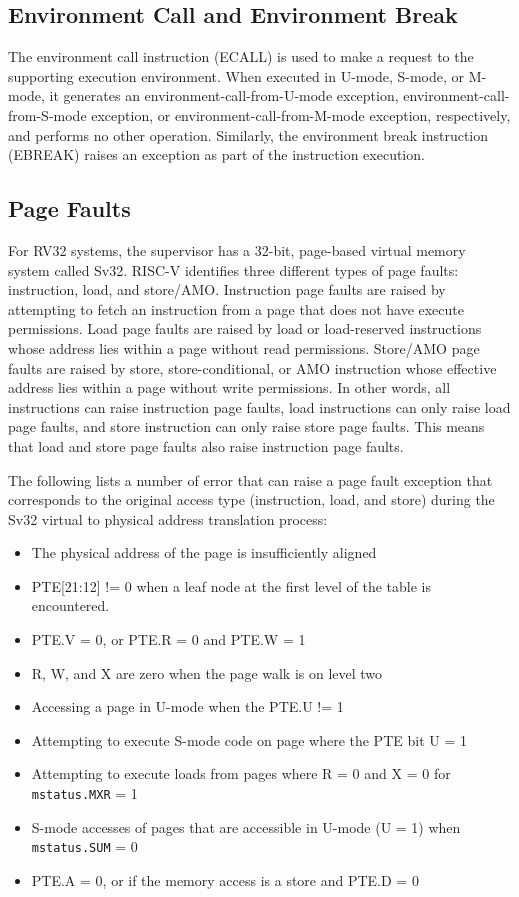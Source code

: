 \documentclass[12pt]{article}
\begin{document}
\subsection{Environment Call and Environment Break}
The environment call instruction (ECALL) is used to make a request to the supporting execution environment. When executed in U-mode, S-mode, or M-mode, it generates an environment-call-from-U-mode exception, environment-call-from-S-mode exception, or environment-call-from-M-mode exception, respectively, and performs no other operation. Similarly, the environment break instruction (EBREAK) raises an exception as part of the instruction execution.

\subsection{Page Faults}
For RV32 systems, the supervisor has a 32-bit, page-based virtual memory system called Sv32. RISC-V identifies three different types of page faults: instruction, load, and store/AMO. Instruction page faults are raised by attempting to fetch an instruction from a page that does not have execute permissions. Load page faults are raised by load or load-reserved instructions whose address lies within a page without read permissions. Store/AMO page faults are raised by store, store-conditional, or AMO instruction whose effective address lies within a page without write permissions. In other words, all instructions can raise instruction page faults, load instructions can only raise load page faults, and store instruction can only raise store page faults. This means that load and store page faults also raise instruction page faults. 

The following lists a number of error that can raise a page fault exception that corresponds to the original access type (instruction, load, and store) during the Sv32 virtual to physical address translation process:
\begin{itemize}
    \item The physical address of the page is insufficiently aligned
    \item PTE[21:12] != 0 when a leaf node at the first level of the table is encountered.
    \item PTE.V = 0, or PTE.R = 0 and PTE.W = 1
    \item R, W, and X are zero when the page walk is on level two
    \item Accessing a page in U-mode when the PTE.U != 1
    \item Attempting to execute S-mode code on page where the PTE bit U = 1
    \item Attempting to execute loads from pages where R = 0 and X = 0 for {\tt{mstatus.MXR}} = 1
    \item S-mode accesses of pages that are accessible in U-mode (U = 1) when {\tt{mstatus.SUM}} = 0
    \item PTE.A = 0, or if the memory access is a store and PTE.D = 0
\end{itemize}
\end{document}
